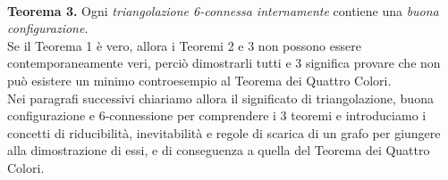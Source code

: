 \documentclass[a4paper,12pt,titlepage]{report}
\begin{document}
    \\{\bfseries Teorema 3.} Ogni \emph{triangolazione 6-connessa internamente} contiene una \emph{buona configurazione}.
    \vspace{0.5cm}
    \\Se il Teorema 1 è vero, allora i Teoremi 2 e 3 non possono essere contemporaneamente veri, perciò dimostrarli tutti e 3 significa provare che non può esistere un minimo controesempio al Teorema dei Quattro Colori.
    \\Nei paragrafi successivi chiariamo allora il significato di triangolazione, buona configurazione e 6-connessione per comprendere i 3 teoremi e introduciamo i concetti di riducibilità, inevitabilità e regole di scarica di un grafo per giungere alla dimostrazione di essi, e di conseguenza a quella del Teorema dei Quattro Colori. 
    
\end{document}
